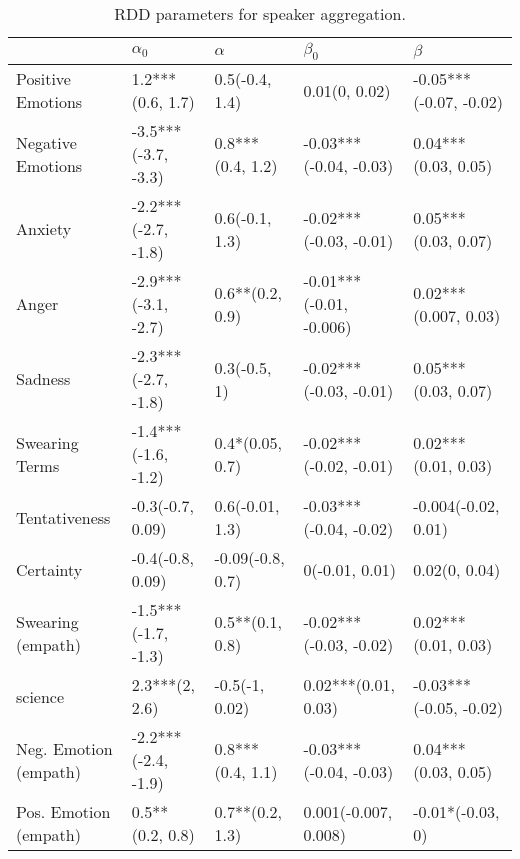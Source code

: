 \begin{table}[h]\centering
\caption{RDD parameters for speaker aggregation.}
	\label{fig: Speaker_1}
\begin{adjustbox}{width=\linewidth, center}
	\begin{tabular}{lllll}
	\toprule
	{} &           $\alpha_0$ &          $\alpha$ &                $\beta_0$ &                 $\beta$ \\
	\midrule
	Positive Emotions     &     1.2***(0.6, 1.7) &    0.5(-0.4, 1.4) &            0.01(0, 0.02) &  -0.05***(-0.07, -0.02) \\
	Negative Emotions     &  -3.5***(-3.7, -3.3) &  0.8***(0.4, 1.2) &   -0.03***(-0.04, -0.03) &     0.04***(0.03, 0.05) \\
	Anxiety               &  -2.2***(-2.7, -1.8) &    0.6(-0.1, 1.3) &   -0.02***(-0.03, -0.01) &     0.05***(0.03, 0.07) \\
	Anger                 &  -2.9***(-3.1, -2.7) &   0.6**(0.2, 0.9) &  -0.01***(-0.01, -0.006) &    0.02***(0.007, 0.03) \\
	Sadness               &  -2.3***(-2.7, -1.8) &      0.3(-0.5, 1) &   -0.02***(-0.03, -0.01) &     0.05***(0.03, 0.07) \\
	Swearing Terms        &  -1.4***(-1.6, -1.2) &   0.4*(0.05, 0.7) &   -0.02***(-0.02, -0.01) &     0.02***(0.01, 0.03) \\
	Tentativeness         &     -0.3(-0.7, 0.09) &   0.6(-0.01, 1.3) &   -0.03***(-0.04, -0.02) &     -0.004(-0.02, 0.01) \\
	Certainty             &     -0.4(-0.8, 0.09) &  -0.09(-0.8, 0.7) &           0(-0.01, 0.01) &           0.02(0, 0.04) \\
	Swearing (empath)     &  -1.5***(-1.7, -1.3) &   0.5**(0.1, 0.8) &   -0.02***(-0.03, -0.02) &     0.02***(0.01, 0.03) \\
	science               &       2.3***(2, 2.6) &    -0.5(-1, 0.02) &      0.02***(0.01, 0.03) &  -0.03***(-0.05, -0.02) \\
	Neg. Emotion (empath) &  -2.2***(-2.4, -1.9) &  0.8***(0.4, 1.1) &   -0.03***(-0.04, -0.03) &     0.04***(0.03, 0.05) \\
	Pos. Emotion (empath) &      0.5**(0.2, 0.8) &   0.7**(0.2, 1.3) &     0.001(-0.007, 0.008) &        -0.01*(-0.03, 0) \\
	\bottomrule
	\end{tabular}
	
\end{adjustbox}
	\end{table}

